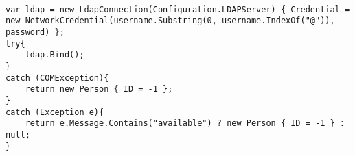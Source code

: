\begin{lstlisting}[caption=Kode til godkendelse af login, label=AD-AUTH]

var ldap = new LdapConnection(Configuration.LDAPServer) { Credential =  new NetworkCredential(username.Substring(0, username.IndexOf("@")), password) };
try{
    ldap.Bind();
}
catch (COMException){
    return new Person { ID = -1 };
}
catch (Exception e){
    return e.Message.Contains("available") ? new Person { ID = -1 } : null;
}
\end{lstlisting}